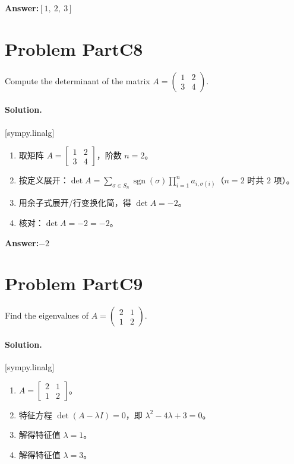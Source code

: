 \documentclass[11pt,a4paper]{ctexart}
\newcommand{\solvertag}[1]{{\footnotesize\color{gray}\textsf{[#1]}}}
\begin{document}
\noindent\textbf{Answer:}\quad $\left[ 1, \  2, \  3\right]$

\medskip

\section*{Problem PartC8}
Compute the determinant of the matrix $A = \begin{pmatrix} 1 & 2 \\ 3 & 4 \end{pmatrix}$.

\paragraph{Solution.} \solvertag{sympy.linalg} 

\begin{enumerate}[leftmargin=*]
  \item 取矩阵 $A = \left[\begin{matrix}1 & 2\\3 & 4\end{matrix}\right]$，阶数 $n = 2$。
  \item 按定义展开：$\det A = \sum_{\sigma \in S_n} \operatorname{sgn}(\sigma)\prod_{i=1}^{n} a_{i,\sigma(i)}$（$n=2$ 时共 $2$ 项）。
  \item 用余子式展开/行变换化简，得 $\det A = -2$。
  \item 核对：$\det A = -2= -2$。
\end{enumerate}

\noindent\textbf{Answer:}\quad $-2$

\medskip

\section*{Problem PartC9}
Find the eigenvalues of $A = \begin{pmatrix} 2 & 1 \\ 1 & 2 \end{pmatrix}$.

\paragraph{Solution.} \solvertag{sympy.linalg} 

\begin{enumerate}[leftmargin=*]
  \item $A = \left[\begin{matrix}2 & 1\\1 & 2\end{matrix}\right]$。
  \item 特征方程 $\det(A - \lambda I) = 0$，即 $\lambda^{2} - 4 \lambda + 3 = 0$。
  \item 解得特征值 $\lambda = 1$。
  \item 解得特征值 $\lambda = 3$。
\end{enumerate}
\end{document}
